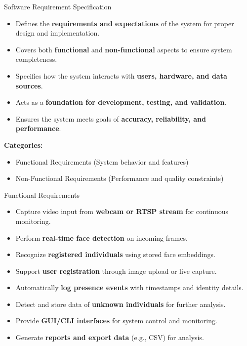 \documentclass[10pt]{beamer}
\begin{document}
\begin{frame}{Software Requirement Specification}

\begin{itemize}
    \item Defines the \textbf{requirements and expectations} of the system for proper design and implementation.
    
    \item Covers both \textbf{functional} and \textbf{non-functional} aspects to ensure system completeness.
    
    \item Specifies how the system interacts with \textbf{users, hardware, and data sources}.
    
    \item Acts as a \textbf{foundation for development, testing, and validation}.
    
    \item Ensures the system meets goals of \textbf{accuracy, reliability, and performance}.
\end{itemize}

\vspace{0.3cm}

\textbf{Categories:}
\begin{itemize}
    \item Functional Requirements (System behavior and features)
    \item Non-Functional Requirements (Performance and quality constraints)
\end{itemize}

\end{frame}
\begin{frame}{Functional Requirements}

\begin{itemize}
    \item Capture video input from \textbf{webcam or RTSP stream} for continuous monitoring.
    
    \item Perform \textbf{real-time face detection} on incoming frames.
    
    \item Recognize \textbf{registered individuals} using stored face embeddings.
    
    \item Support \textbf{user registration} through image upload or live capture.
    
    \item Automatically \textbf{log presence events} with timestamps and identity details.
    
    \item Detect and store data of \textbf{unknown individuals} for further analysis.
    
    \item Provide \textbf{GUI/CLI interfaces} for system control and monitoring.
    
    \item Generate \textbf{reports and export data} (e.g., CSV) for analysis.
\end{itemize}

\end{frame}
\end{document}

